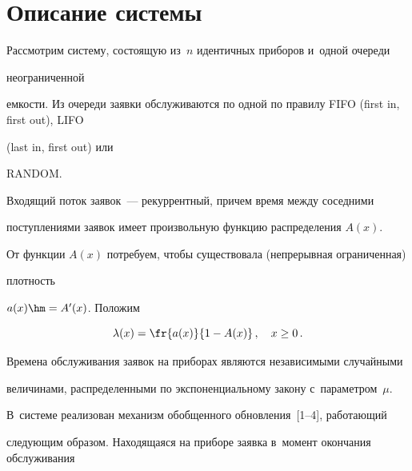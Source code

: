 \section{Описание системы}



\vspace*{-2pt}





Рассмотрим систему, состоящую из~$n$ идентичных приборов и~одной очереди 

неограниченной

емкости. Из очереди заявки обслуживаются по одной по правилу FIFO (first in, first out), LIFO

(last in, first out) или 

RANDOM.

Входящий поток заявок~--- рекуррентный, причем время между соседними 

поступлениями заявок имеет произвольную функцию распределения $A(x)$.

От функции $A(x)$ потребуем, чтобы существовала (непрерывная ограниченная) 

плот\-ность

$a(x)\hm=A'(x)$. Положим 



\noindent

$$

\lambda(x)=\fr{a(x)}{1- A(x)}\,, \quad

x\ge0\,.

$$



\vspace*{-2pt}



\noindent

Времена обслуживания заявок на приборах являются независимыми случайными 

величинами, распределенными по экспоненциальному закону с~па\-ра\-мет\-ром~$\mu$.\linebreak\vspace*{-12pt}



\pagebreak



\noindent

В~системе реализован механизм обобщенного обновления~[1--4], ра\-бо\-та\-ющий 

следующим образом. Находящаяся на приборе заявка в~момент окончания обслуживания 

